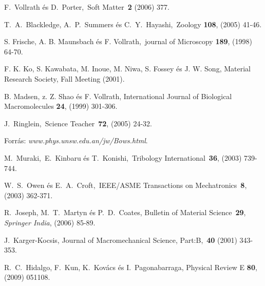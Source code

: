 \begin{thebibliography}{200}

\vspace*{-0.3cm}
 F.\ Vollrath \'es D.\ Porter,\ Soft Matter\ {\bf2} (2006) 377.

\vspace*{-0.3cm}
 T.\ A.\ Blackledge, A.\ P.\ Summers \'es C.\ Y.\ Hayashi,\ Zoology {\bf 108}, (2005) 41-46.

\vspace*{-0.3cm}
 S. Frische, A. B. Maunsbach \'es F. Vollrath,\ journal of Microscopy {\bf 189}, (1998) 64-70.

\vspace*{-0.3cm}
 F. K. Ko, S. Kawabata, M. Inoue, M. Niwa, S. Fossey \'es J. W. Song, Material Research Society, Fall Meeting (2001).

\vspace*{-0.3cm}
 B. Madsen, z. Z. Shao \'es F. Vollrath, International Journal of Biological Macromolecules {\bf 24}, (1999) 301-306.

\vspace*{-0.3cm}
 J.\ Ringlein,\ Science Teacher\ {\bf72}, (2005) 24-32.

\vspace*{-0.3cm}
 Forr\'as: {\it www.phys.unsw.edu.an/jw/Bows.html}.

\vspace*{-0.3cm}
 M.\ Muraki,\ E.\ Kinbaru \'es T.\ Konishi,\ Tribology International\ {\bf36}, (2003) 739-744.

\vspace*{-0.3cm}
 W.\ S.\ Owen \'es E.\ A.\ Croft,\  IEEE/ASME Transactions on Mechatronics\ {\bf8}, (2003) 362-371.

\vspace*{-0.3cm}
 R.\ Joseph, M.\ T.\ Martyn \'es P.\ D.\ Coates, Bulletin of Material Science\ {\bf 29}, {\it Springer India}, (2006) 85-89.

\vspace*{-0.3cm}
 J.\ Karger-Kocsis, Journal of Macromechanical Science, Part:B,\ {\bf 40} (2001) 343-353.

\vspace*{-0.3cm}
 R.\ C.\ Hidalgo, F.\ Kun, K.\ Kov\'acs \'es I.\ Pagonabarraga, Physical Review E {\bf80}, (2009) 051108.


\end{thebibliography}

